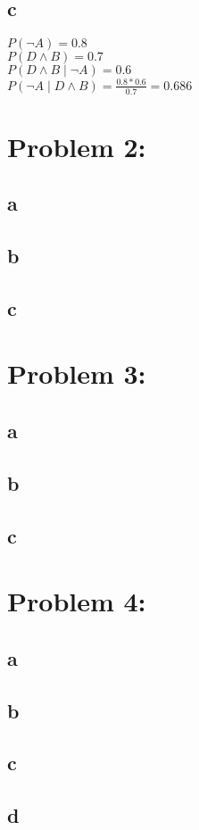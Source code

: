 \documentclass[11pt, oneside]{article}   	%
\begin{document}
\begin{flushleft}
\subsection*{c}
$P(\neg A)=0.8$\\
$P(D \wedge B)=0.7$\\
$P(D \wedge B \mid \neg A)=0.6$\\
$P(\neg A \mid D \wedge B)=\frac{0.8*0.6}{0.7}=0.686$\\
\section*{Problem 2:}
\subsection*{a}
\subsection*{b}
\subsection*{c}
\section*{Problem 3:}
\subsection*{a}
\subsection*{b}
\subsection*{c}
\section*{Problem 4:}
\subsection*{a}
\subsection*{b}
\subsection*{c}
\subsection*{d}

\end{flushleft}
\end{document}
